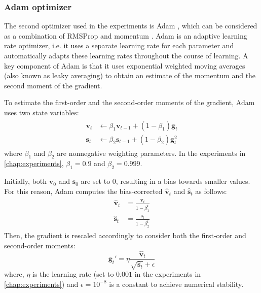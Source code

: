 \subsubsection{Adam optimizer}
The second optimizer used in the experiments is Adam \cite{kingma2014adam}, which can be considered as a combination of RMSProp \cite{hinton2012neural} and momentum \cite{sutskever2013importance}. Adam is an adaptive learning rate optimizer, i.e. it uses a separate learning rate for each parameter and automatically adapts these learning rates throughout the course of learning. A key component of Adam is that it uses exponential weighted moving averages (also known as leaky averaging) to obtain an estimate of the momentum and the second moment of the gradient.

To estimate the first-order and the second-order moments of the gradient, Adam uses two state variables:
\begin{equation}
    \begin{split}\begin{aligned}
        \mathbf{v}_t & \leftarrow \beta_1 \mathbf{v}_{t-1} + (1 - \beta_1) \mathbf{g}_t \\
        \mathbf{s}_t & \leftarrow \beta_2 \mathbf{s}_{t-1} + (1 - \beta_2) \mathbf{g}_t^2
    \end{aligned}\end{split}
\end{equation}
where $\beta_1$ and $\beta_2$ are nonnegative weighting parameters. In the experiments in \autoref{chap:experiments}, $\beta_1=0.9$ and $\beta_2=0.999$.

Initially, both $\mathbf{v}_0$ and $\mathbf{s}_0$ are set to 0, resulting in a bias towards smaller values. For this reason, Adam computes the bias-corrected $\hat{\mathbf{v}}_t$ and $\hat{\mathbf{s}}_t$ as follows:
\begin{equation}
    \begin{split}\begin{aligned}
        \hat{\mathbf{v}}_t & = \frac{\mathbf{v}_t}{1 - \beta_1^t} \\
        \hat{\mathbf{s}}_t & = \frac{\mathbf{s}_t}{1 - \beta_2^t}
    \end{aligned}\end{split}
\end{equation}
Then, the gradient is rescaled accordingly to consider both the first-order and second-order moments:
\begin{equation}
    \mathbf{g}_t' = \eta \frac{ \hat{\mathbf{v}}_t}{\sqrt{\hat{\mathbf{s}}_t} + \epsilon}
\end{equation}
where, $\eta$ is the learning rate (set to $0.001$ in the experiments in \autoref{chap:experiments}) and $\epsilon = 10^{-8}$ is a constant to achieve numerical stability.

